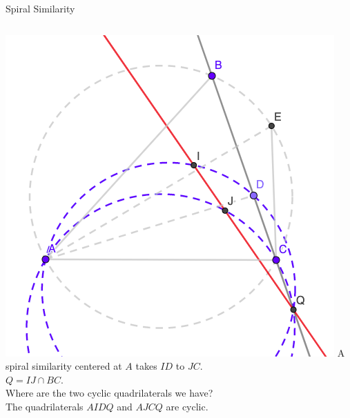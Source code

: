 \documentclass{beamer}
\begin{document}
\begin{frame}{Spiral Similarity}
	\begin{columns}
		\includegraphics[scale=0.34]{spi11.png}
		A spiral similarity centered at $A$ takes $ID$ to $JC$.\\
		$Q = IJ\cap BC$.\\
		\phantom{Spacing}
		Where are the two cyclic quadrilaterals we have?\\
		\phantom{Spacing}
		The quadrilaterals $AIDQ$ and $AJCQ$ are cyclic.
	\end{columns}
\end{frame}
\end{document}
